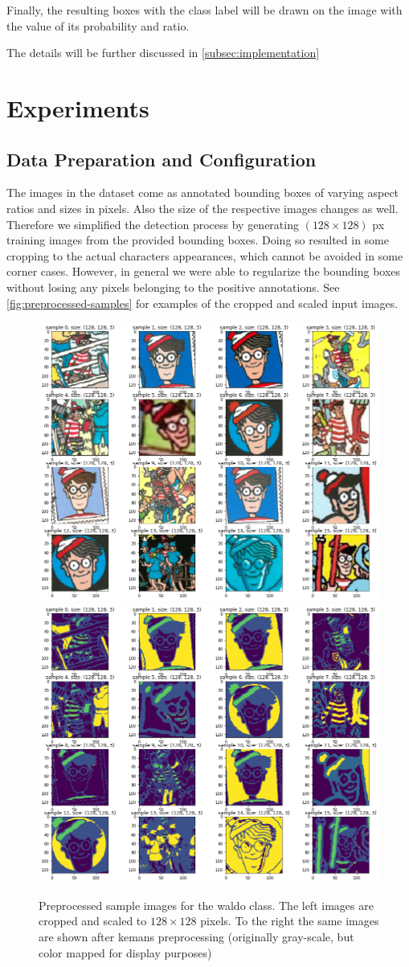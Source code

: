 \documentclass[11pt]{article}
\begin{document}
Finally, the resulting boxes with the class label will be drawn on the image with the value of its probability and ratio.

The details will be further discussed in \autoref{subsec:implementation}\\


\section{Experiments}
\subsection{Data Preparation and Configuration}\label{subsec:data-prep}

The images in the dataset come as annotated bounding boxes of varying aspect ratios and sizes in pixels.
Also the size of the respective images changes as well. Therefore we simplified the detection process by
generating \( (128 \times 128) \) px training images from the provided bounding boxes. 
Doing so resulted in some cropping to the actual characters appearances, which cannot be avoided in some corner cases.
However, in general we were able to regularize the bounding boxes without losing any pixels belonging to the positive annotations.
See \autoref{fig:preprocessed-samples} for examples of the cropped and scaled input images.

\begin{figure}
    \centering
    \includegraphics[width=0.4\linewidth]{figures/preprocess_waldo} 
    \hspace{1cm}
    \includegraphics[width=0.4\linewidth]{figures/kmeans_waldo} 
    \caption{Preprocessed sample images for the waldo class. The left images are cropped and scaled to \( 128 \times 128 \) pixels.
    To the right the same images are shown after kemans preprocessing (originally gray-scale, but color mapped for display purposes)}
    \label{fig:preprocessed-samples}
\end{figure}
\end{document}
